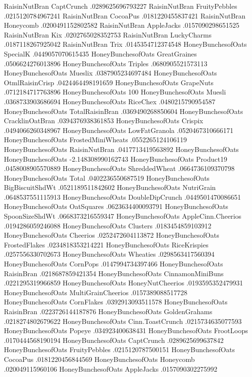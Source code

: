 RaisinNutBran	CaptCrunch	.0289625696793227
RaisinNutBran	FruityPebbles	.0215120784967241
RaisinNutBran	CocoaPus	.0181220455837421
RaisinNutBran	Honeycomb	.0200491152802582
RaisinNutBran	AppleJacks	.0157090298651525
RaisinNutBran	Kix	.0202765028352753
RaisinNutBran	LuckyCharms	.0187118267925042
RaisinNutBran	Trix	.0145354712374548
HoneyBunchesofOats	SpecialK	.0449057070615435
HoneyBunchesofOats	GreatGraines	.0506624276013896
HoneyBunchesofOats	Triples	.0680905521573113
HoneyBunchesofOats	Mueslix	.0387905234697484
HoneyBunchesofOats	OtmlRaisinCrisp	.0424464498191659
HoneyBunchesofOats	GrapeNuts	.0712184717763896
HoneyBunchesofOats	100%
HoneyBunchesofOats	Muesli	.0368733903686694
HoneyBunchesofOats	RiceChex	.0480215790954587
HoneyBunchesofOats	TotalRaisinBran	.0369490268850604
HoneyBunchesofOats	CracklinOatBran	.0394376938361853
HoneyBunchesofOats	Crispix	.0494066260348967
HoneyBunchesofOats	LowFatGranola	.0520467310666171
HoneyBunchesofOats	FrostedMiniWheats	.0552265124106119
HoneyBunchesofOats	RaisinNutBran	.0417713419563892
HoneyBunchesofOats	HoneyBunchesofOats	-2.148308990162743
HoneyBunchesofOats	Product19	.0458008905570889
HoneyBunchesofOats	ShreddedWheat	.0664736109370798
HoneyBunchesofOats	Total	.0402236550687519
HoneyBunchesofOats	BigBiscuitShdWt	.0521189511842602
HoneyBunchesofOats	NutriGrain	.0648537551115913
HoneyBunchesofOats	DoubleDipCrunch	.0449501470086651
HoneyBunchesofOats	OatSquares	.0623634400093791
HoneyBunchesofOats	SpoonSizeShdWt	.0668373216559347
HoneyBunchesofOats	AppleCinn.Cheerios	.0194286059246088
HoneyBunchesofOats	Clusters	.0183454859103912
HoneyBunchesofOats	Cheerios	.0252472604113872
HoneyBunchesofOats	FrostedFlakes	.0234818353214221
HoneyBunchesofOats	RiceKrispies	.0257556330702673
HoneyBunchesofOats	Wheaties	.0298563417560394
HoneyBunchesofOats	CornPops	.0147994734397466
HoneyBunchesofOats	RaisinBran	.0218687859421354
HoneyBunchesofOats	CinnamonMiniBuns	.0221295319966859
HoneyBunchesofOats	HoneyNutCheerios	.0193595352479931
HoneyBunchesofOats	MultiGrainCheerios	.0157389088517728
HoneyBunchesofOats	CornFlakes	.0392913093511578
HoneyBunchesofOats	RaisinBran	.0223726144187876
HoneyBunchesofOats	GoldenGrahams	.0218274802679622
HoneyBunchesofOats	Cinn.ToastCrunch	.0215734635077593
HoneyBunchesofOats	Popeye	.034923400638431
HoneyBunchesofOats	FrootLoops	.0170444568190194
HoneyBunchesofOats	CaptCrunch	.0289625699637842
HoneyBunchesofOats	FruityPebbles	.0215120787500151
HoneyBunchesofOats	CocoaPus	.0181220456844569
HoneyBunchesofOats	Honeycomb	.020049115960106
HoneyBunchesofOats	AppleJacks	.0157090302275992
